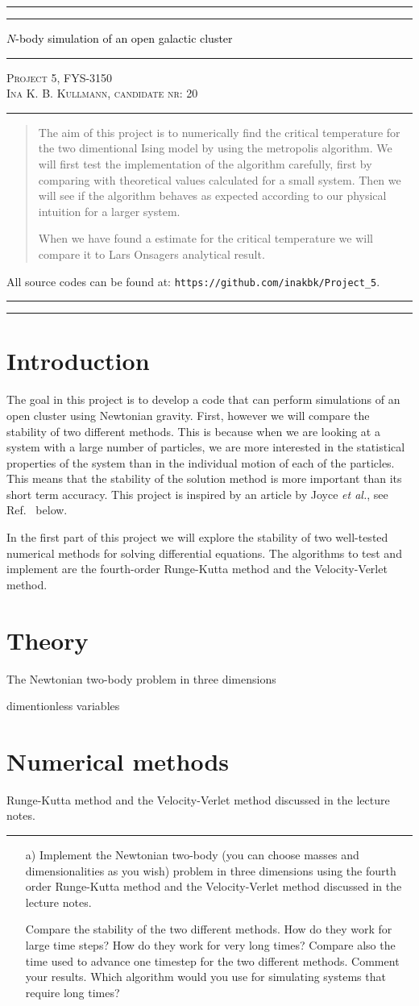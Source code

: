 \documentclass[11pt,a4wide]{article}
\newcommand*{\titleAT}{\begingroup %
\newlength{\drop} %
\drop=0.1\textheight %

\rule{\textwidth}{1pt}\par %
\vspace{2pt}\vspace{-\baselineskip} %
\rule{\textwidth}{0.4pt}\par %

\vspace{0.5\drop} %
\centering %
\textcolor{black}{ %
{\Huge $N$-body simulation of an open galactic cluster}\\[0.75\baselineskip] %
} 

\vspace{0.25\drop} %
\rule{0.3\textwidth}{0.4pt}\par %
\vspace{0.25\drop} %

{\Large \textsc{Project 5, FYS-3150\\[0.75\baselineskip] \normalsize{Ina K. B. Kullmann, candidate nr: 20}
}}\par %


\vspace{0.25\drop} %
\rule{0.3\textwidth}{0.4pt}\par %
\vspace{0.25\drop} %

\begin{abstract}
The aim of this project is to numerically find the critical temperature for the two dimentional Ising model by using the metropolis algorithm. We will first test the implementation of the algorithm carefully, first by comparing with theoretical values calculated for a small system. Then we will see if the algorithm behaves as expected according to our physical intuition for a larger system.

When we have found a estimate for the critical temperature we will compare it to Lars Onsagers analytical result.

\end{abstract}
\vspace*{0.25\drop} %

\begin{center}
{ \scriptsize \noindent All source codes can be found at: \texttt{https://github.com/inakbk/Project\_5}. }
\end{center}

\rule{\textwidth}{0.4pt}\par %
\vspace{2pt}\vspace{-\baselineskip} %
\rule{\textwidth}{1pt}\par %

\endgroup}
\begin{document}
\titleAT %


\newpage
\tableofcontents
\newpage

\section{Introduction}

The goal in this project is to develop a code that can perform simulations of an open cluster using Newtonian gravity. First, however we will compare the stability of two different methods. This is because when we are looking at a system with a large number of particles, we are more interested in the statistical properties of the system than in the individual motion of each of the particles. This means that the stability of the solution method is more important than its short term accuracy.  This project is inspired by an article by Joyce {\em et al.}, see Ref.~\cite{joyce2010} below.

In the first part of this project we will explore the stability of two well-tested numerical methods for solving differential equations. The algorithms to test and implement are the fourth-order Runge-Kutta method and the Velocity-Verlet method. 

\section{Theory}
The Newtonian two-body problem in three dimensions

dimentionless variables

\section{Numerical methods}
Runge-Kutta method and the Velocity-Verlet method discussed in the lecture notes.
  
  
\rule{0.3\textwidth}{0.4pt}\par %

\begin{enumerate}
\item[a)] Implement the Newtonian two-body (you can choose masses and dimensionalities as
  you wish) problem in three dimensions using the fourth order
  Runge-Kutta method and the Velocity-Verlet method discussed in
  the lecture notes.

 Compare the
stability of the two different methods. How do they work for large
time steps? How do they work for very long times? Compare also the
time used to advance one timestep for the two different
methods. Comment your results. Which algorithm would you use for
simulating systems that require long  times?

\end{enumerate}
\end{document}
